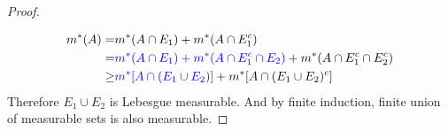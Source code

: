 \begin{enumerate}
\begin{proof}
\begin{center}
\end{center}
	\begin{align*}
		m^\ast(A) = & m^\ast(A \cap E_1) + m^\ast(A \cap E_1^c) \\
		= & {\color{blue}m^\ast(A \cap E_1) + m^\ast(A \cap E_1^c \cap E_2)} + m^\ast(A \cap E_1^c \cap E_2^c) \\
		\ge & {\color{blue}m^\ast[A \cap (E_1 \cup E_2)]} + m^\ast[A \cap (E_1 \cup E_2)^c] 
	\end{align*}
	Therefore $E_1 \cup E_2$ is Lebesgue measurable. And by finite induction, finite union of measurable sets is also measurable.
	\end{proof}


\end{enumerate}
